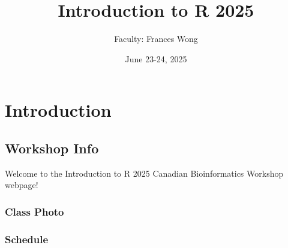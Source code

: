 \documentclass[
]{book}
\title{Introduction to R 2025}
\author{Faculty: Frances Wong}
\date{June 23-24, 2025}
\begin{document}
\maketitle

{
\setcounter{tocdepth}{1}
\tableofcontents
}
\part{Introduction}\label{part-introduction}

\chapter{Workshop Info}\label{workshop-info}

Welcome to the Introduction to R 2025 Canadian Bioinformatics Workshop webpage!

\section{Class Photo}\label{class-photo}

\section{Schedule}\label{schedule}
\end{document}
